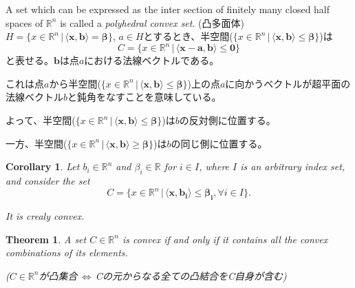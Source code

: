 \documentclass{jsarticle}
\newtheorem{thm}{Theorem}[section]
\newtheorem{cor}{Corollary}[thm]
\theoremstyle{definition}
\begin{document}
A set which can be expressed as the inter section of finitely
many closed half spaces of $\mathbb{R}^n$ is called a
\textit{polyhedral convex set}. (凸多面体)\\



$H = \{ x \in \mathbb{R}^n\,| \,\langle \bm{x}, \bm{b} \rangle =\bm{\beta } \} $,
$a \in H$とするとき、半空間($\{ x \in \mathbb{R}^n\,| \,\langle \bm{x},
\bm{b} \rangle \le \bm{\beta} \} $)は
\[
C = \{ x \in \mathbb{R}^n\,| \,\langle \bm{x - a}, \bm{b}
\rangle \le \bm{0} \}
\]
と表せる。$\bm{b}$は点$a$における法線ベクトルである。

これは点$a$から半空間($\{ x \in \mathbb{R}^n\,| \,\langle \bm{x}, \bm{b}
\rangle \le \bm{\beta} \}
$)上の点$a$に向かうベクトルが超平面の法線ベクトル$b$と鈍角をなすことを意味している。

よって、半空間($\{ x \in \mathbb{R}^n\,| \,\langle \bm{x}, \bm{b}
\rangle \le \bm{\beta} \} $)は$b$の反対側に位置する。

一方、半空間($\{ x \in \mathbb{R}^n\,| \,\langle \bm{x}, \bm{b}
\rangle \ge \bm{\beta} \} $)は$b$の同じ側に位置する。\\



\begin{cor}
Let $b_i \in \mathbb{R}^n$ and  $\beta_i \in \mathbb{R}$ for $i \in I$, where $I$ is an arbitrary index set, and consider the set 
\[
C = \{ x \in \mathbb{R}^n\,| \,\langle \bm{x}, \bm{b_i}
\rangle \le \bm{\beta_i}, \forall i \in I \}.
\]

It is crealy convex.\\
\end{cor}

\begin{thm}
A set $C \in \mathbb{R}^n$ is convex if and only if it contains all the convex combinations of its elements.

($C \in \mathbb{R}^n$が凸集合$\, \Longleftrightarrow \, $Cの元からなる全ての凸結合をC自身が含む)\\　
\end{thm}
\end{document}
